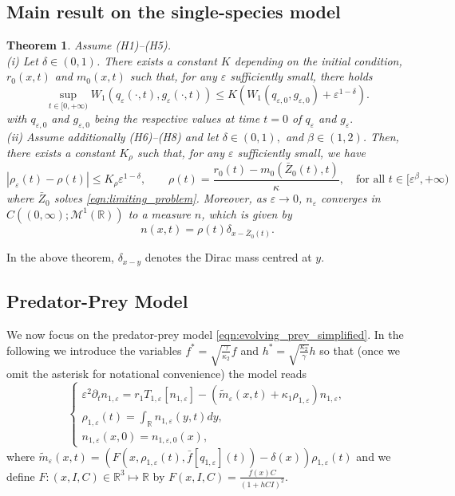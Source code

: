 \documentclass[]{article}
\newtheorem{theorem}{Theorem}
\theoremstyle{remark}
\begin{document}
\subsection*{Main result on the single-species model} 
\begin{theorem}
\label{thm:main}
Assume (H1)--(H5). \\
(i) Let $\delta\in (0,1)$.  There exists a constant $K$ depending on the initial condition,   {$r_0(x,t) $ and $m_0(x,t)$} such that,  for any $\varepsilon$ sufficiently small, there holds 
\begin{equation}
\label{est-main-Was}
\sup_{t\in[0,+\infty)} W_1(q_{\varepsilon }(\cdot,t),g_{\varepsilon }(\cdot,t)) \leq  K \left( W_1(q_{\varepsilon,0},g_{\varepsilon,0}) + \varepsilon^{1-\delta} \right).
\end{equation}
with $q_{\varepsilon,0}$ and $g_{\varepsilon,0}$ being the respective values at time $t=0$ of $q_\varepsilon$ and $g_{\varepsilon}.$\\
(ii) Assume additionally (H6)--(H8) and let $\delta\in (0,1),$ and $\beta\in (1,2)$. Then, there exists a constant $K_\rho$ such that, for any $\varepsilon$ sufficiently small, we have
\begin{equation}
\label{as-rho}
| \rho_\varepsilon(t)-\rho(t)|\leq K_\rho\varepsilon^{1-\delta},\qquad \rho(t)=\frac{r_0(t)-m_0(\bar{Z}_0(t),t)}{\kappa},\quad \text{for all $t\in [\varepsilon^\beta,+\infty)$}
\end{equation}
  where $\bar{Z}_0$ solves \eqref{eqn:limiting_problem}. Moreover, as $\varepsilon\to 0$, $n_\varepsilon$ converges in $C\left((0,\infty) ; \mathcal{M}^1(\mathbb{R}) \right)$ to a measure $n$, which is given by 
 $$
 n(x,t)=\rho(t)\delta_{x-\bar{Z}_0(t)}.
 $$
\end{theorem}
In the above theorem, $\delta_{x-y}$ denotes the Dirac mass centred at $y$.
\subsection{Predator-Prey Model}
We now focus on the predator-prey model \eqref{eqn:evolving_prey_simplified}. In the following we introduce the variables $f^{*}=\sqrt{\frac{\gamma}{\kappa_2}}f$ and $h^{*}=\sqrt{\frac{\kappa_2}{\gamma}}h$ so that (once we omit the asterisk for notational convenience) the model reads
\begin{equation} \label{eqn:IP_standard_form}
\begin{cases}
\varepsilon^2 \partial_t   n_{1,\varepsilon}= r_1T_{{1,\varepsilon}}  [ n_{1,\varepsilon}]  
-   \left( \tilde{m}_{\varepsilon}(x,t)  + \kappa_1 \rho_{1,\varepsilon} \right) n_{1,\varepsilon} ,\\
\rho_{1,\varepsilon}(t)= \int_{\mathbb R}   n_{1,\varepsilon}(y,t)dy,\\
n_{1,\varepsilon}(x,0)=n_{{1,\varepsilon},0}(x), 
\end{cases}
\end{equation}
where $\tilde{m}_\varepsilon(x,t)=(F(x,\rho_{1,\varepsilon}(t),\bar{f}[q_{1,\varepsilon}](t))-\delta(x))\rho_{1,\varepsilon}(t)$ and we define $F:(x,I,C)\in\mathbb{R}^3\mapsto{}\mathbb{R}$ by $F(x,I,C)=\frac{f(x)C}{(1+hCI)^2}$.
\end{document}
